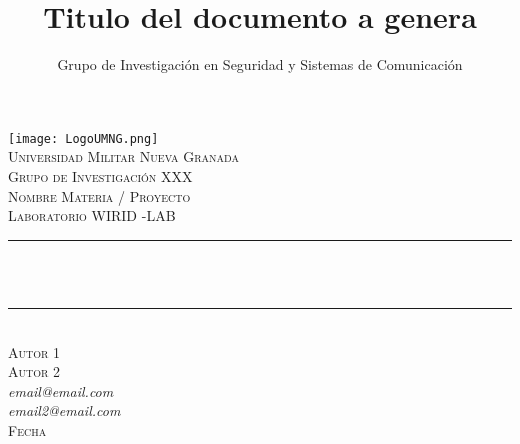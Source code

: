 \documentclass[12pt,spanish]{article}
\title{Titulo del documento a genera  }
\author{ Grupo de Investigación en Seguridad y Sistemas de Comunicación }
\makeatletter
\let\thetitle\@title
\let\theauthor\@author
\makeatother
\begin{document}
	
	
	\begin{titlepage}
		\centering
		\vspace*{0.5 cm}
		\texttt{[image: LogoUMNG.png]}\\[1.0 cm]	%
		
		\textsc{\LARGE Universidad Militar Nueva Granada  }\\[0.5 cm]	%
		
		\textsc{\large Grupo de Investigación XXX  }\\[1 cm]	%
		
		
		\textsc{\large Nombre Materia / Proyecto  }\\[1 cm]				%
		
		
		
		\textsc{\large Laboratorio WIRID -LAB  }\\[0.5 cm] 
		
		\rule{\linewidth}{0.2 mm} \\[0.4 cm]
		{ \huge \bfseries \thetitle}\\
		\rule{\linewidth}{0.2 mm} \\[1.5 cm]
		
	
	    \textsc{\large Autor 1 \\
	    Autor 2 }\\[1cm]
		
		\large{\textit{email@email.com \\ email2@email.com}}\\[1cm]
			
		\textsc{\large Fecha }\\[1.5 cm]
		
		\begin{minipage}{0.7\textwidth}
			\begin{flushleft} \large
				
			\end{flushleft}
		\end{minipage}~
		

\end{titlepage}
\end{document}
